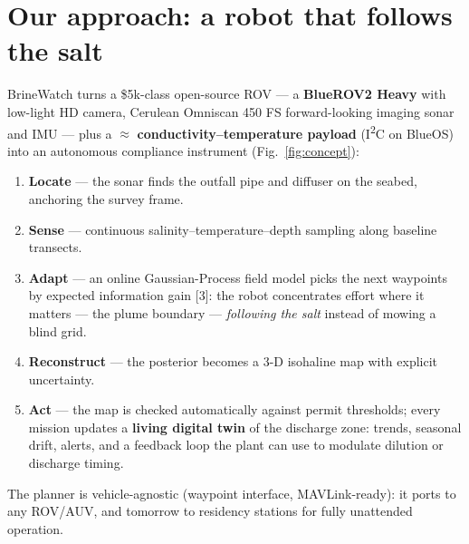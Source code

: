 \documentclass[10pt,a4paper]{article}
\newcommand{\keyword}[1]{\textbf{\color{deepblue}#1}}
\begin{document}
\section{Our approach: a robot that follows the salt}
BrineWatch turns a \$5k-class open-source ROV --- a \keyword{BlueROV2 Heavy} with low-light HD camera, Cerulean Omniscan 450 FS forward-looking imaging sonar and IMU --- plus a ${\approx}$ \keyword{conductivity--temperature payload} (I\textsuperscript{2}C on BlueOS) into an autonomous compliance instrument (Fig.~\ref{fig:concept}):
\begin{enumerate}
  \item \keyword{Locate} --- the sonar finds the outfall pipe and diffuser on the seabed, anchoring the survey frame.
  \item \keyword{Sense} --- continuous salinity--temperature--depth sampling along baseline transects.
  \item \keyword{Adapt} --- an online Gaussian-Process field model picks the next waypoints by expected information gain [3]: the robot concentrates effort where it matters --- the plume boundary --- \emph{following the salt} instead of mowing a blind grid.
  \item \keyword{Reconstruct} --- the posterior becomes a 3-D isohaline map with explicit uncertainty.
  \item \keyword{Act} --- the map is checked automatically against permit thresholds; every mission updates a \keyword{living digital twin} of the discharge zone: trends, seasonal drift, alerts, and a feedback loop the plant can use to modulate dilution or discharge timing.
\end{enumerate}
The planner is vehicle-agnostic (waypoint interface, MAVLink-ready): it ports to any ROV/AUV, and tomorrow to residency stations for fully unattended operation.

\end{document}
